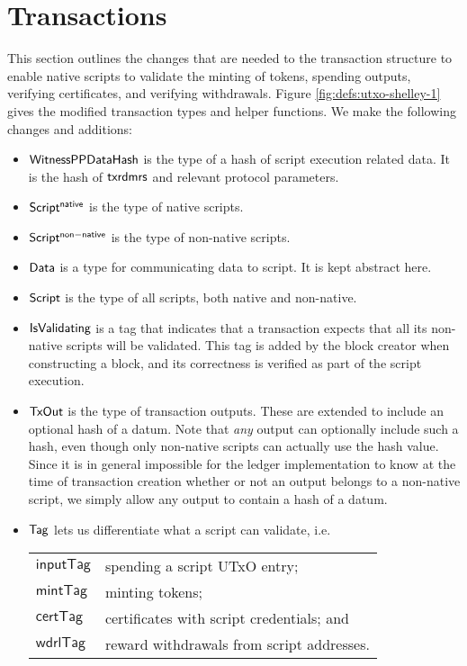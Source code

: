 \section{Transactions}
\label{sec:transactions}

This section outlines the changes that are needed to the transaction
structure to enable native scripts to validate
the minting of tokens, spending outputs, verifying certificates, and
verifying withdrawals.
%
Figure \ref{fig:defs:utxo-shelley-1} gives the modified transaction types and helper functions.
We make the following changes and additions:

\begin{itemize}
  \item $\mathsf{WitnessPPDataHash}$ is the type of a hash of script execution
  related data. It is the hash of $\mathsf{txrdmrs}$ and relevant protocol parameters.

  \item $\mathsf{Script^{native}}$ is the type of native scripts.

  \item $\mathsf{Script^{non-native}}$ is the type of non-native scripts.

  \item $\mathsf{Data}$ is a type for communicating data to script.  It is kept abstract here.

  \item $\mathsf{Script}$ is the type of all scripts, both native and non-native.

  \item $\mathsf{IsValidating}$ is a tag that indicates that a transaction
  expects that all its non-native scripts will be validated.
  This tag is added by the block creator when
  constructing a block, and its correctness is verified as part of the script execution.

  \item $\mathsf{TxOut}$ is the type of transaction outputs. These are extended to include
  an optional hash of a datum. Note that \emph{any} output can
  optionally include such a hash, even though only non-native scripts
  can actually use the hash value. Since it is in general impossible for the ledger implementation to
  know at the time of transaction creation whether or not an output belongs to a non-native
  script, we simply allow any output to contain a hash of a datum.

  \item $\mathsf{Tag}$ lets us differentiate what a script
  can validate, i.e. \\
  \begin{tabular}{l@{~to validate~}l}
  $\mathsf{inputTag}$ & spending a script UTxO entry; \\
  $\mathsf{mintTag}$ & minting tokens; \\
  $\mathsf{certTag}$  & certificates with script credentials; and  \\
  $\mathsf{wdrlTag}$ & reward withdrawals from script addresses.
  \end{tabular}


\end{itemize}

